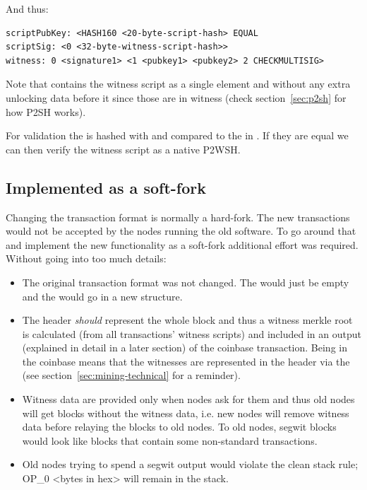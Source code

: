 And thus:

\begin{emphbox}
\begin{lstlisting}[style=Pseudomath]
scriptPubKey: <HASH160 <20-byte-script-hash> EQUAL
scriptSig: <0 <32-byte-witness-script-hash>>
witness: 0 <signature1> <1 <pubkey1> <pubkey2> 2 CHECKMULTISIG>
\end{lstlisting}
\end{emphbox}

Note that  contains the witness script as a single element and without any extra unlocking data before it since those are in witness (check section~\ref{sec:p2sh} for how P2SH works).

For validation the  is hashed with  and compared to the  in . If they are equal we can then verify the witness script as a native P2WSH.


\subsection*{Implemented as a soft-fork}
Changing the transaction format is normally a hard-fork. The new transactions would not be accepted by the nodes running the old software. To go around that and implement the new functionality as a soft-fork additional effort was required. Without going into too much details:

\begin{itemize}
\item The original transaction format was not changed. The  would just be empty and the  would go in a new structure.
\item The header \emph{should} represent the whole block and thus a witness merkle root is calculated (from all transactions' witness scripts) and included in an  output (explained in detail in a later section) of the coinbase transaction. Being in the coinbase means that the witnesses are represented in the header via the  (see section~\ref{sec:mining-technical} for a reminder).
\item Witness data are provided only when nodes ask for them and thus old nodes will get blocks without the witness data, i.e. new nodes will remove witness data before relaying the blocks to old nodes. To old nodes, segwit blocks would look like blocks that contain some non-standard transactions.
\item Old nodes trying to spend a segwit output would violate the clean stack rule; OP\_0 <bytes in hex> will remain in the stack.
\end{itemize}


